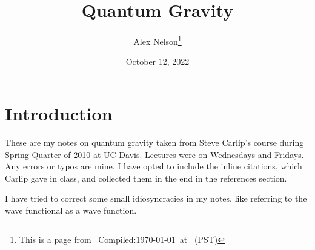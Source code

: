 \documentclass{article}
\title{Quantum Gravity}
\author{Alex Nelson\thanks{This is a page from \homeurl{}\hfil\break\indent\;\, Compiled:\enspace\today\ at \currenttime\ (PST)}}
\date{October 12, 2022}
\begin{document}
\maketitle

\section*{Introduction}
These are my notes on quantum gravity taken from Steve Carlip's course during Spring Quarter of 2010 at UC Davis. Lectures were on Wednesdays and Fridays.
Any errors or typos are mine. I have opted to include the inline citations, which Carlip gave in class, and collected them in the end in the references section.

I have tried to correct some small idiosyncracies in my notes, like
referring to the wave functional as a wave function.















\end{document}
